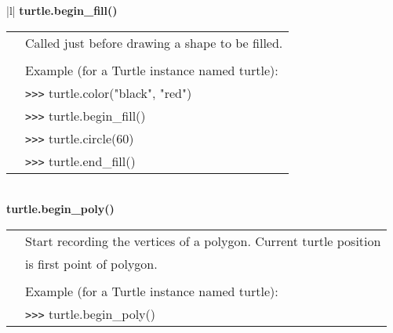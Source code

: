 \begin{center}
{\begin{tabular}{|l|}
{\bf    turtle.begin\_fill()} \\
   \begin{tabular}{p{0.25in}p{4in}}
&        Called just before drawing a shape to be filled. \\
&  \\
&        Example (for a Turtle instance named turtle): \\
&        \verb+>+\verb+>+\verb+>+ turtle.color("black", "red") \\
&        \verb+>+\verb+>+\verb+>+ turtle.begin\_fill() \\
&        \verb+>+\verb+>+\verb+>+ turtle.circle(60) \\
&        \verb+>+\verb+>+\verb+>+ turtle.end\_fill() \\
\end{tabular} \\ \hline
{\bf    turtle.begin\_poly()} \\
   \begin{tabular}{p{0.25in}p{4in}}
&        Start recording the vertices of a polygon. Current turtle position \\
&        is first point of polygon. \\
&  \\
&        Example (for a Turtle instance named turtle): \\
&        \verb+>+\verb+>+\verb+>+ turtle.begin\_poly() \\
\end{tabular} \\ \hline






\end{tabular}}
\end{center}
